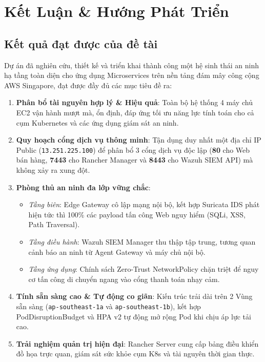 \chapter{Kết Luận \& Hướng Phát Triển}
\label{ch:conclusion}

\section{Kết quả đạt được của đề tài}
Dự án đã nghiên cứu, thiết kế và triển khai thành công một hệ sinh thái an ninh hạ tầng toàn diện cho ứng dụng Microservices trên nền tảng đám mây công cộng AWS Singapore, đạt được đầy đủ các mục tiêu đề ra:

\begin{enumerate}
    \item \textbf{Phân bổ tài nguyên hợp lý \& Hiệu quả}: Toàn bộ hệ thống 4 máy chủ EC2 vận hành mượt mà, ổn định, đáp ứng tối ưu năng lực tính toán cho cả cụm Kubernetes và các ứng dụng giám sát an ninh.
    \item \textbf{Quy hoạch cổng dịch vụ thông minh}: Tận dụng duy nhất một địa chỉ IP Public (\texttt{13.251.225.100}) để phân bổ 3 cổng dịch vụ độc lập (\textbf{80} cho Web bán hàng, \textbf{7443} cho Rancher Manager và \textbf{8443} cho Wazuh SIEM API) mà không xảy ra xung đột.
    \item \textbf{Phòng thủ an ninh đa lớp vững chắc}:
    \begin{itemize}
        \item \textit{Tầng biên}: Edge Gateway cô lập mạng nội bộ, kết hợp Suricata IDS phát hiện tức thì 100\% các payload tấn công Web nguy hiểm (SQLi, XSS, Path Traversal).
        \item \textit{Tầng điều hành}: Wazuh SIEM Manager thu thập tập trung, tương quan cảnh báo an ninh từ Agent Gateway và máy chủ nội bộ.
        \item \textit{Tầng ứng dụng}: Chính sách Zero-Trust NetworkPolicy chặn triệt để nguy cơ tấn công di chuyển ngang vào cổng thanh toán nhạy cảm.
    \end{itemize}
    \item \textbf{Tính sẵn sàng cao \& Tự động co giãn}: Kiến trúc trải dài trên 2 Vùng sẵn sàng (\texttt{ap-southeast-1a} và \texttt{ap-southeast-1b}), kết hợp PodDisruptionBudget và HPA v2 tự động mở rộng Pod khi chịu áp lực tải cao.
    \item \textbf{Trải nghiệm quản trị hiện đại}: Rancher Server cung cấp bảng điều khiển đồ họa trực quan, giám sát sức khỏe cụm K8s và tài nguyên thời gian thực.
\end{enumerate}

